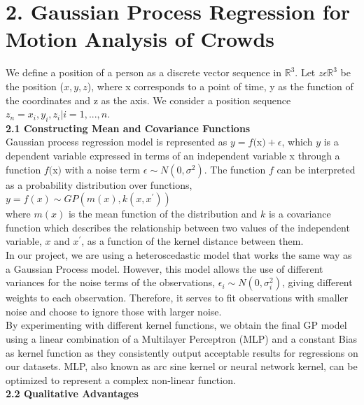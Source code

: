 \documentclass[letterpaper]{article}
\begin{document}
\section{2.  Gaussian Process Regression for Motion Analysis of Crowds}

We define a position of a person as a discrete vector sequence in $\mathbb{R}^3$. Let $z \epsilon \mathbb{R}^3$ be the position ($x, y, z$), where x corresponds to a point of time, y as the function of the coordinates and z as the axis. We consider a position sequence $z_n = {x_i, y_i, z_i} | i = 1,...,n$. \\

{\bf2.1  Constructing Mean and Covariance Functions} \\

Gaussian process regression model is represented as $y = f($x$) + \epsilon$, which $y$ is a dependent variable expressed in terms of an independent variable x through a function $f($x$)$ with a noise term $\epsilon \sim N(0, \sigma^2)$. The function $f$ can be interpreted as a probability distribution over functions, \\

$ y = f(x) \sim GP(m(x), k(x,x^\prime))$ \\

where $m(x)$ is the mean function of the distribution and $k$ is a covariance function which describes the relationship between two values of the independent variable, $x$ and $x^\prime$, as a function of the kernel distance between them. \\

In our project, we are using a heteroscedastic model that works the same way as a Gaussian Process model. However, this model allows the use of different variances for the noise terms of the observations, $\epsilon_i \sim N(0, \sigma_i^2)$, giving different weights to each observation. Therefore, it serves to fit observations with smaller noise and choose to ignore those with larger noise. \\

By experimenting with different kernel functions, we obtain the final GP model using a linear combination of a Multilayer Perceptron (MLP) and a constant Bias as kernel function as they consistently output acceptable results for regressions on our datasets. MLP, also known as arc sine kernel or neural network kernel, can be optimized to represent a complex non-linear function. \\

{\bf2.2  Qualitative Advantages} \\
\end{document}
